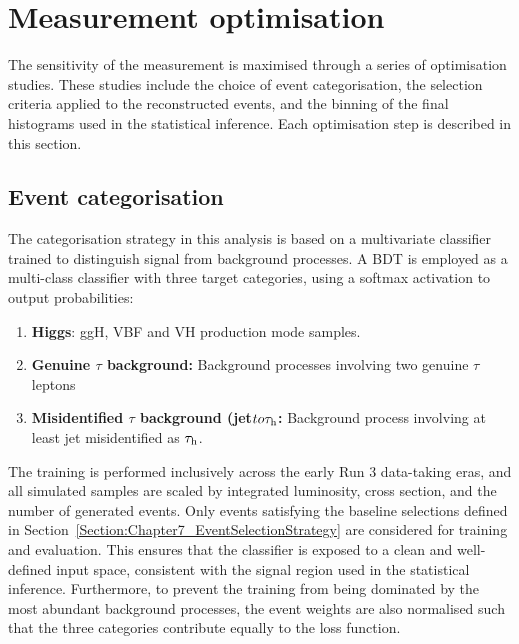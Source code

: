 \section{Measurement optimisation}
\label{Section:Chapter7_Optimisation}
The sensitivity of the measurement is maximised through a series of optimisation studies. These studies include the choice of event categorisation, the selection criteria applied to the reconstructed events, and the binning of the final histograms used in the statistical inference. Each optimisation step is described in this section.

\subsection{Event categorisation}
\label{Section:Chapter7_EventCategorisation}
The categorisation strategy in this analysis is based on a multivariate classifier trained to distinguish signal from background processes. 
A \ac{BDT} is employed as a multi-class classifier with three target categories, using a softmax activation to output probabilities: 

\begin{enumerate}[label=(\roman*)]
    \item \textbf{Higgs}: ggH, VBF and VH production mode samples.
    \item \textbf{Genuine $\tau$ background:} Background processes involving two genuine $\tau$ leptons
    \item \textbf{Misidentified $\tau$ background (jet$ to \tau_\mathrm{h}$:} Background process involving at least jet misidentified as $\tau_\mathrm{h}$.
\end{enumerate}

The training is performed inclusively across the early Run 3 data-taking eras, and all simulated samples are scaled by integrated luminosity, cross section, and the number of generated events. Only events satisfying the baseline selections defined in Section~\ref{Section:Chapter7_EventSelectionStrategy} are considered for training and evaluation. This ensures that the classifier is exposed to a clean and well-defined input space, consistent with the signal region used in the statistical inference. Furthermore, to prevent the training from being dominated by the most abundant background processes, the event weights are also normalised such that the three categories contribute equally to the loss function.  

